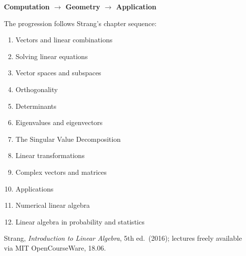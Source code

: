 \begin{center}
\textbf{Computation $\longrightarrow$ Geometry $\longrightarrow$ Application}
\end{center}

The progression follows Strang's chapter sequence:

\begin{enumerate}
  \item Vectors and linear combinations
  \item Solving linear equations
  \item Vector spaces and subspaces
  \item Orthogonality
  \item Determinants
  \item Eigenvalues and eigenvectors
  \item The Singular Value Decomposition
  \item Linear transformations
  \item Complex vectors and matrices
  \item Applications
  \item Numerical linear algebra
  \item Linear algebra in probability and statistics
\end{enumerate}

\begin{remark*}
Strang, \textit{Introduction to Linear Algebra}, 5th ed.\ (2016);
lectures freely available via MIT OpenCourseWare, 18.06.
\end{remark*}



\clearpage

\clearpage

\clearpage

\clearpage

\clearpage

\clearpage

\clearpage

\clearpage

\clearpage

\clearpage

\clearpage

\clearpage
